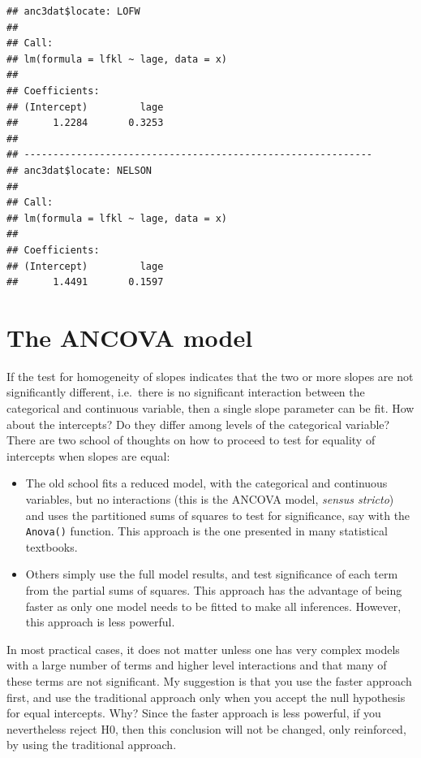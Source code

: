 \documentclass[
  12pt,
]{book}
\providecommand{\tightlist}{%
  \setlength{\itemsep}{0pt}\setlength{\parskip}{0pt}}
\begin{document}
\begin{verbatim}
## anc3dat$locate: LOFW        
## 
## Call:
## lm(formula = lfkl ~ lage, data = x)
## 
## Coefficients:
## (Intercept)         lage  
##      1.2284       0.3253  
## 
## ------------------------------------------------------------ 
## anc3dat$locate: NELSON      
## 
## Call:
## lm(formula = lfkl ~ lage, data = x)
## 
## Coefficients:
## (Intercept)         lage  
##      1.4491       0.1597
\end{verbatim}

\hypertarget{the-ancova-model}{%
\section{The ANCOVA model}\label{the-ancova-model}}

If the test for homogeneity of slopes indicates that the two or more slopes are not significantly different, i.e.~there is no significant interaction between the categorical and continuous variable, then a single slope parameter can be fit. How about the intercepts? Do they differ among levels of the categorical variable? There are two school of thoughts on how to proceed to test for equality of intercepts when slopes are equal:

\begin{itemize}
\tightlist
\item
  The old school fits a reduced model, with the categorical and continuous variables, but no interactions (this is the ANCOVA model, \emph{sensus stricto}) and uses the partitioned sums of squares to test for significance, say with the \texttt{Anova()} function. This approach is the one presented in many statistical textbooks.
\item
  Others simply use the full model results, and test significance of each term from the partial sums of squares. This approach has the advantage of being faster as only one model needs to be fitted to make all inferences. However, this approach is less powerful.
\end{itemize}

In most practical cases, it does not matter unless one has very complex models with a large number of terms and higher level interactions and that many of these terms are not significant. My suggestion is that you use the faster approach first, and use the traditional approach only when you accept the null hypothesis for equal intercepts. Why? Since the faster approach is less powerful, if you nevertheless reject H0, then this conclusion will not be changed, only reinforced, by using the traditional approach.
\end{document}
